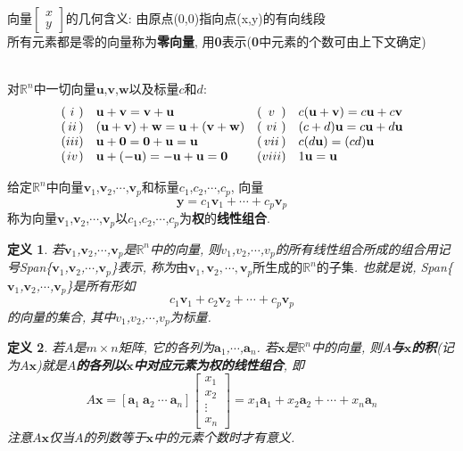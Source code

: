 \documentclass[UTF8,fontset=ubuntu]{ctexart}
\theoremstyle{nonumberplain}
\newtheorem{definition}{定义}
\theoremstyle{break}
\theoremstyle{empty}
\begin{document}
向量$\left[\begin{array}{r}x\\y\end{array}\right]$的几何含义: 由原点(0,0)指向点(x,y)的有向线段\\
所有元素都是零的向量称为\textbf{零向量}, 用\textbf{0}表示(\textbf{0}中元素的个数可由上下文确定)\\
\begin{law}\ \\
对$\mathbb{R}^n$中一切向量$\mathbf{u}$,$\mathbf{v}$,$\mathbf{w}$以及标量$c$和$d$:
\begin{equation*}
\begin{array}{l@{}c@{}l l l@{}c@{}l l}
( & i & ) & \mathbf{u}+\mathbf{v}=\mathbf{v}+\mathbf{u} & ( & v & ) & c(\mathbf{u}+\mathbf{v})=c\mathbf{u}+c\mathbf{v}\\
( & ii & ) & (\mathbf{u}+\mathbf{v})+\mathbf{w}=\mathbf{u}+(\mathbf{v}+\mathbf{w}) & ( & vi & ) & (c+d)\mathbf{u}=c\mathbf{u}+d\mathbf{u}\\
( & iii & ) & \mathbf{u}+\mathbf{0}=\mathbf{0}+\mathbf{u}=\mathbf{u} & ( & vii & ) & c(d\mathbf{u})=(cd)\mathbf{u}\\
( & iv & ) & \mathbf{u}+(-\mathbf{u})=-\mathbf{u}+\mathbf{u}=\mathbf{0} & ( & viii & ) & 1\mathbf{u}=\mathbf{u}
\end{array}
\end{equation*}
\end{law}
给定$\mathbb{R}^n$中向量$\mathbf{v}_1$,$\mathbf{v}_2$,$\cdots$,$\mathbf{v}_p$和标量$c_1$,$c_2$,$\cdots$,$c_p$, 向量
	\[\mathbf{y}=c_1\mathbf{v}_1+\cdots+c_p\mathbf{v}_p\]
称为向量$\mathbf{v}_1$,$\mathbf{v}_2$,$\cdots$,$\mathbf{v}_p$以$c_1$,$c_2$,$\cdots$,$c_p$为\textbf{权}的\textbf{线性组合}.\\[2ex]
\begin{definition}
若$\mathbf{v}_1$,$\mathbf{v}_2$,$\cdots$,$\mathbf{v}_p$是$\mathbb{R}^n$中的向量, 则$v_1$,$v_2$,$\cdots$,$v_p$的所有线性组合所成的组合用记号Span\{$\mathbf{v}_1$,$\mathbf{v}_2$,$\cdots$,$\mathbf{v}_p$\}表示, 称为\textbf{$\text{由}\mathbf{v}_1,\mathbf{v}_2,\cdots,\mathbf{v}_p\text{所生成的}\mathbb{R}^n\text{的子集}$}. 也就是说, Span\{$\mathbf{v}_1$,$\mathbf{v}_2$,$\cdots$,$\mathbf{v}_p$\}是所有形如
	\[c_1\mathbf{v}_1+c_2\mathbf{v}_2+\cdots+c_p\mathbf{v}_p\]
的向量的集合, 其中$v_1$,$v_2$,$\cdots$,$v_p$为标量.\\[2ex]
\end{definition}
\begin{definition}
若$A$是$m\times n$矩阵, 它的各列为$\bm{a}_1$,$\cdots$,$\bm{a}_n$. 若$\bm{x}$是$\mathbb{R}^n$中的向量, 则\textbf{$A$与$\bm{x}$的积}(记为$A\bm{x}$)就是\textbf{$A$的各列以$\bm{x}$中对应元素为权的线性组合}, 即
	\[A\bm{x}=[\bm{a}_1\ \bm{a}_2\ \cdots\ \bm{a}_n]\left[\begin{array}{c}x_1\\x_2\\\vdots\\x_n\end{array}\right]=x_1\bm{a}_1+x_2\bm{a}_2+\cdots+x_n\bm{a}_n\]
注意$A\bm{x}$仅当$A$的列数等于$\bm{x}$中的元素个数时才有意义.\\[2ex]
\end{definition}
\end{document}
